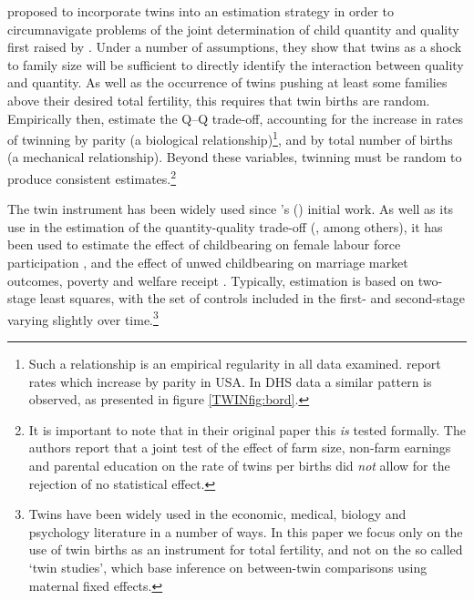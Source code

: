 \documentclass[subeqn]{article}
\begin{document}
\begin{spacing}{1.4}
\citet{RosenzweigWolpin1980} proposed to incorporate twins into an estimation
strategy in order to circumnavigate problems of the joint determination of child 
quantity and quality first raised by \citet{Becker1960,BeckerLewis1973,
Willis1973,DeTray1973,BeckerTomes1976}.  Under a number of assumptions, they show 
that twins as a shock to family size will be sufficient to directly identify the 
interaction between quality and quantity.  As well as the occurrence of twins 
pushing at least some families above their desired total fertility, this requires 
that twin births are random.  Empirically then, \citet{RosenzweigWolpin1980} 
estimate the Q--Q trade-off, accounting for the increase in rates of twinning by 
parity (a biological relationship)\footnote{Such a relationship is an empirical 
regularity in all data examined. \citet{RosenzweigWolpin1980} report rates which 
increase by parity in USA.  In DHS data a similar pattern is observed, as 
presented in figure \ref{TWINfig:bord}.}, and by total number of births (a 
mechanical relationship).  Beyond these variables, twinning must be random to
produce consistent estimates.\footnote{It is important to note that in their
original paper this \emph{is} tested formally.  The authors report that a joint
test of the effect of farm size, non-farm earnings and parental education on the
rate of twins per births did \emph{not} allow for the rejection of no 
statistical effect.}

The twin instrument has been widely used since \citeauthor{RosenzweigWolpin1980}'s
(\citeyear{RosenzweigWolpin1980}) initial work. As well as its use in the 
estimation of the quantity-quality trade-off (\citet{Blacketal2005,Caceres2006,
Lietal2008,Angristetal2010}, among others), it has been used to 
estimate the effect of childbearing on female labour force participation 
\citep{RosenzweigWolpin1980b,Jacobsenetal1999,AngristEvans1998}, and the effect 
of unwed childbearing on marriage market outcomes, poverty and welfare receipt 
\citep{BronarsGrogger1994}.  Typically, estimation is based on two-stage least
squares, with the set of controls included in the first- and second-stage 
varying slightly over time.\footnote{Twins have been widely used in the economic, 
medical, biology and psychology literature in a number of ways.  In this paper 
we focus only on the use of twin births as an instrument for total fertility, 
and not on the so called `twin studies', which base inference on between-twin 
comparisons using maternal fixed effects.}


\end{spacing}
\end{document}
